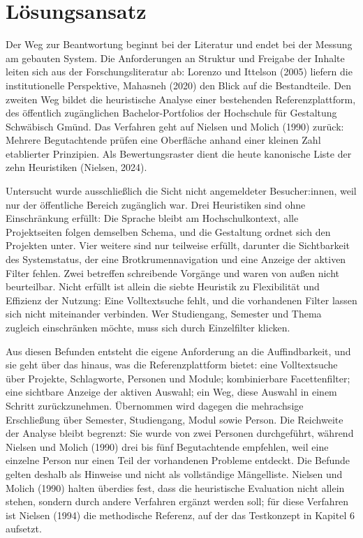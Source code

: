 \section{Lösungsansatz}
\label{sec:loesungsansatz}

Der Weg zur Beantwortung beginnt bei der Literatur und endet bei der Messung am gebauten System. Die Anforderungen an Struktur und Freigabe der Inhalte leiten sich aus der Forschungsliteratur ab: Lorenzo und Ittelson (2005) liefern die institutionelle Perspektive, Mahasneh (2020) den Blick auf die Bestandteile. Den zweiten Weg bildet die heuristische Analyse einer bestehenden Referenzplattform, des öffentlich zugänglichen Bachelor-Portfolios der Hochschule für Gestaltung Schwäbisch Gmünd. Das Verfahren geht auf Nielsen und Molich (1990) zurück: Mehrere Begutachtende prüfen eine Oberfläche anhand einer kleinen Zahl etablierter Prinzipien. Als Bewertungsraster dient die heute kanonische Liste der zehn Heuristiken (Nielsen, 2024).

Untersucht wurde ausschließlich die Sicht nicht angemeldeter Besucher:innen, weil nur der öffentliche Bereich zugänglich war. Drei Heuristiken sind ohne Einschränkung erfüllt: Die Sprache bleibt am Hochschulkontext, alle Projektseiten folgen demselben Schema, und die Gestaltung ordnet sich den Projekten unter. Vier weitere sind nur teilweise erfüllt, darunter die Sichtbarkeit des Systemstatus, der eine Brotkrumennavigation und eine Anzeige der aktiven Filter fehlen. Zwei betreffen schreibende Vorgänge und waren von außen nicht beurteilbar. Nicht erfüllt ist allein die siebte Heuristik zu Flexibilität und Effizienz der Nutzung: Eine Volltextsuche fehlt, und die vorhandenen Filter lassen sich nicht miteinander verbinden. Wer Studiengang, Semester und Thema zugleich einschränken möchte, muss sich durch Einzelfilter klicken.

Aus diesen Befunden entsteht die eigene Anforderung an die Auffindbarkeit, und sie geht über das hinaus, was die Referenzplattform bietet: eine Volltextsuche über Projekte, Schlagworte, Personen und Module; kombinierbare Facettenfilter; eine sichtbare Anzeige der aktiven Auswahl; ein Weg, diese Auswahl in einem Schritt zurückzunehmen. Übernommen wird dagegen die mehrachsige Erschließung über Semester, Studiengang, Modul sowie Person. Die Reichweite der Analyse bleibt begrenzt: Sie wurde von zwei Personen durchgeführt, während Nielsen und Molich (1990) drei bis fünf Begutachtende empfehlen, weil eine einzelne Person nur einen Teil der vorhandenen Probleme entdeckt. Die Befunde gelten deshalb als Hinweise und nicht als vollständige Mängelliste. Nielsen und Molich (1990) halten überdies fest, dass die heuristische Evaluation nicht allein stehen, sondern durch andere Verfahren ergänzt werden soll; für diese Verfahren ist Nielsen (1994) die methodische Referenz, auf der das Testkonzept in Kapitel 6 aufsetzt.

